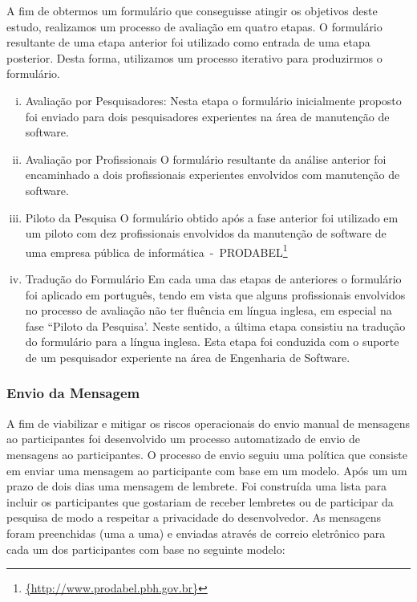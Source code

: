 A fim de obtermos um formulário que conseguisse atingir os objetivos deste
estudo, realizamos um processo de avaliação em quatro etapas. O formulário
resultante de uma etapa anterior foi utilizado como entrada de uma etapa
posterior. Desta forma, utilizamos um processo iterativo para produzirmos o
formulário.
\begin{enumerate}[(i)]
	\item Avaliação por Pesquisadores: Nesta etapa o formulário inicialmente
		proposto foi enviado para dois pesquisadores experientes na área de
		manutenção de software.
	\item Avaliação por Profissionais O formulário resultante da análise
		anterior foi encaminhado a dois profissionais experientes envolvidos com
		manutenção de software.
	\item Piloto da Pesquisa O formulário obtido após a fase anterior foi
		utilizado em um piloto com
		dez profissionais envolvidos da manutenção de software de uma empresa
		pública de
		informática~-~PRODABEL\footnote{\url{{http://www.prodabel.pbh.gov.br}}}
	\item Tradução do Formulário Em cada uma das etapas de anteriores o
		formulário foi aplicado em
		português, tendo em vista que alguns profissionais envolvidos no
		processo de avaliação não
		ter fluência em língua inglesa, em especial na fase ``Piloto da
		Pesquisa'. Neste sentido, a última etapa  consistiu na tradução do
		formulário para a língua inglesa.  Esta etapa foi conduzida com  o
		suporte de um pesquisador experiente na área de Engenharia de Software.	
\end{enumerate}

\subsubsection{Envio da Mensagem}

A fim de viabilizar e mitigar os riscos operacionais do envio manual de
mensagens ao participantes foi desenvolvido um processo automatizado de envio de
mensagens ao participantes. O processo de envio seguiu uma política que consiste
em enviar uma mensagem ao participante com base em um modelo. Após um um prazo
de dois dias uma mensagem de lembrete. Foi construída uma lista para incluir os
participantes que gostariam de receber lembretes ou de participar da pesquisa de
modo a respeitar a privacidade do desenvolvedor. As mensagens foram preenchidas
(uma a uma) e enviadas através de correio eletrônico para cada um dos
participantes com base no seguinte modelo:

